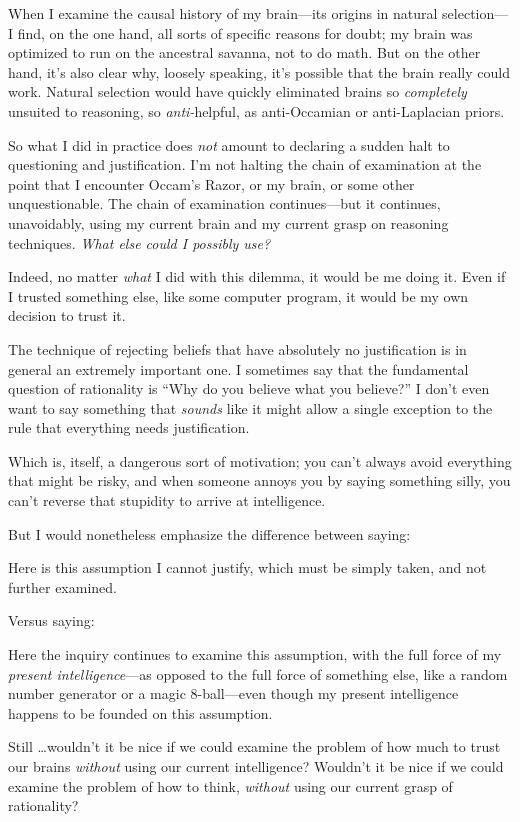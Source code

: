 {
 When I examine the causal history of my brain---its origins in
natural selection---I find, on the one hand, all sorts of specific
reasons for doubt; my brain was optimized to run on the ancestral
savanna, not to do math. But on the other hand, it's
also clear why, loosely speaking, it's possible that
the brain really could work. Natural selection would have quickly
eliminated brains so \textit{completely} unsuited to reasoning, so
\textit{anti-}helpful, as anti-Occamian or anti-Laplacian priors.}

{
 So what I did in practice does \textit{not} amount to declaring a
sudden halt to questioning and justification. I'm not
halting the chain of examination at the point that I encounter
Occam's Razor, or my brain, or some other
unquestionable. The chain of examination continues---but it continues,
unavoidably, using my current brain and my current grasp on reasoning
techniques. \textit{What else could I possibly use?}}

{
 Indeed, no matter \textit{what} I did with this dilemma, it would
be me doing it. Even if I trusted something else, like some computer
program, it would be my own decision to trust it.}

{
 The technique of rejecting beliefs that have absolutely no
justification is in general an extremely important one. I sometimes say
that the fundamental question of rationality is ``Why
do you believe what you believe?'' I
don't even want to say something that \textit{sounds}
like it might allow a single exception to the rule that everything
needs justification.}

{
 Which is, itself, a dangerous sort of motivation; you
can't always avoid everything that might be risky, and
when someone annoys you by saying something silly, you
can't reverse that stupidity to arrive at
intelligence.}

{
 But I would nonetheless emphasize the difference between saying:}

{
 Here is this assumption I cannot justify, which must be simply
taken, and not further examined.}

{
 Versus saying:}

{
 Here the inquiry continues to examine this assumption, with the
full force of my \textit{present intelligence}{}---as opposed to the
full force of something else, like a random number generator or a magic
8-ball---even though my present intelligence happens to be founded on
this assumption.}

{
 Still \ldots wouldn't it be nice if we could
examine the problem of how much to trust our brains \textit{without}
using our current intelligence? Wouldn't it be nice if
we could examine the problem of how to think, \textit{without} using
our current grasp of rationality?}


